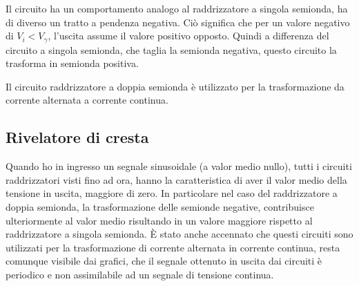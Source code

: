 \documentclass[../elettronica]{subfiles}
\begin{document}
\noindent Il circuito ha un comportamento analogo al raddrizzatore a singola semionda, ha di diverso un tratto a pendenza negativa.
Ciò significa che per un valore negativo di $V_i < V_\gamma$, l'uscita assume il valore positivo opposto.
Quindi a differenza del circuito a singola semionda, che taglia la semionda negativa, questo circuito la trasforma in semionda positiva.
\begin{figure}[h]
    \centering
    \begin{minipage}[b]{.45\textwidth}
    \end{minipage}
    \begin{minipage}[b]{.45\textwidth}
    \end{minipage}
\end{figure}

\noindent Il circuito raddrizzatore a doppia semionda è utilizzato per la trasformazione da corrente alternata a corrente continua.

\newpage
\subsection{Rivelatore di cresta}
Quando ho in ingresso un segnale sinusoidale (a valor medio nullo), tutti i circuiti raddrizzatori visti fino ad ora,
hanno la caratteristica di aver il valor medio della tensione in uscita, maggiore di zero.
In particolare nel caso del raddrizzatore a doppia semionda, la trasformazione delle semionde negative, contribuisce
ulteriormente al valor medio risultando in un valore maggiore rispetto al raddrizzatore a singola semionda.
È stato anche accennato che questi circuiti sono utilizzati per la trasformazione di corrente alternata in corrente continua,
resta comunque visibile dai grafici, che il segnale ottenuto in uscita dai circuiti è periodico e non
assimilabile ad un segnale di tensione continua.
\end{document}
